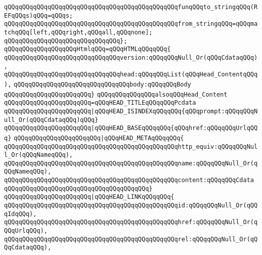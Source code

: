 \verb|qQQqqQQqqQQqqQQqqQQqqQQqqQQqqQQqqQQqqQQqqQQqqQQqfunqQQqto_stringqQQq(REFqQQqs)qQQq=qQQqs;|\newline
\verb|qQQqqQQqqQQqqQQqqQQqqQQqqQQqqQQqqQQqqQQqqQQqqQQqfrom_stringqQQq=qQQqmatchqQQq[left,qQQqright,qQQqall,qQQqnone];|\newline
\verb|qQQqqQQqqQQqqQQqqQQqqQQqqQQqqQQq};|\newline
\newline
\verb|qQQqqQQqqQQqqQQqqQQqHtmlqQQq=qQQqHTMLqQQqqQQq{|\newline
\verb|qQQqqQQqqQQqqQQqqQQqqQQqqQQqqQQqversion:qQQqqQQqNull_Or(qQQqCdataqQQq),|\newline
\verb|qQQqqQQqqQQqqQQqqQQqqQQqqQQqqQQqhead:qQQqqQQqList(qQQqHead_ContentqQQq),|\newline
\verb|qQQqqQQqqQQqqQQqqQQqqQQqqQQqqQQqbody:qQQqqQQqBody|\newline
\verb|qQQqqQQqqQQqqQQqqQQqqQQq}|\newline
\newline
\verb|qQQqqQQqqQQqqQQqalsoqQQqHead_Content|\newline
\verb|qQQqqQQqqQQqqQQqqQQqqQQq=qQQqHEAD_TITLEqQQqqQQqPcdata|\newline
\verb|qQQqqQQqqQQqqQQqqQQqqQQq|\verb#|qQQqHEAD_ISINDEXqQQqqQQq{qQQqprompt:qQQqqQQqNull_Or(qQQqCdataqQQq)qQQq}#\newline
\verb|qQQqqQQqqQQqqQQqqQQqqQQq|\verb#|qQQqHEAD_BASEqQQqqQQq{qQQqhref:qQQqqQQqUrlqQQq}#\newline
\verb|qQQqqQQqqQQqqQQqqQQqqQQq|\verb#|qQQqHEAD_METAqQQqqQQq{#\newline
\verb|qQQqqQQqqQQqqQQqqQQqqQQqqQQqqQQqqQQqqQQqqQQqqQQqhttp_equiv:qQQqqQQqNull_Or(qQQqNameqQQq),|\newline
\verb|qQQqqQQqqQQqqQQqqQQqqQQqqQQqqQQqqQQqqQQqqQQqqQQqname:qQQqqQQqNull_Or(qQQqNameqQQq),|\newline
\verb|qQQqqQQqqQQqqQQqqQQqqQQqqQQqqQQqqQQqqQQqqQQqqQQqcontent:qQQqqQQqCdata|\newline
\verb|qQQqqQQqqQQqqQQqqQQqqQQqqQQqqQQqqQQqqQQq}|\newline
\verb|qQQqqQQqqQQqqQQqqQQqqQQq|\verb#|qQQqHEAD_LINKqQQqqQQq{#\newline
\verb|qQQqqQQqqQQqqQQqqQQqqQQqqQQqqQQqqQQqqQQqqQQqqQQqid:qQQqqQQqNull_Or(qQQqIdqQQq),|\newline
\verb|qQQqqQQqqQQqqQQqqQQqqQQqqQQqqQQqqQQqqQQqqQQqqQQqhref:qQQqqQQqNull_Or(qQQqUrlqQQq),|\newline
\verb|qQQqqQQqqQQqqQQqqQQqqQQqqQQqqQQqqQQqqQQqqQQqqQQqrel:qQQqqQQqNull_Or(qQQqCdataqQQq),|\newline
